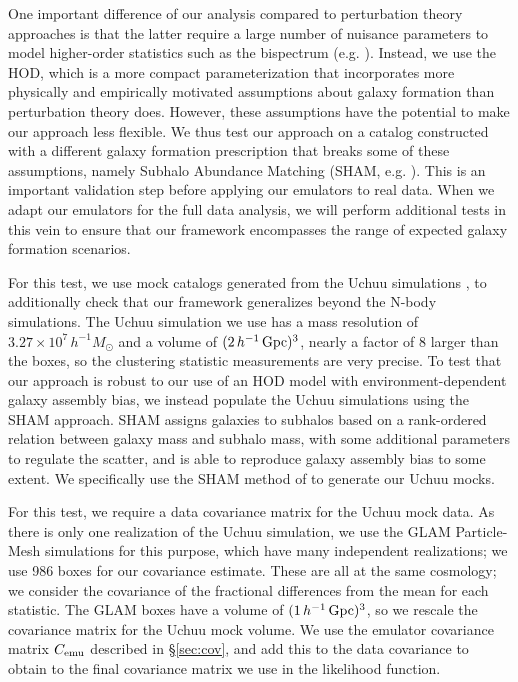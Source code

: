 One important difference of our analysis compared to perturbation theory approaches is that the latter require a large number of nuisance parameters to model higher-order statistics such as the bispectrum (e.g. \citealt{philcox_cosmology_2022}).
Instead, we use the HOD, which is a more compact parameterization that incorporates more physically and empirically motivated assumptions about galaxy formation than perturbation theory does.
However, these assumptions have the potential to make our approach less flexible.
We thus test our approach on a catalog constructed with a different galaxy formation prescription that breaks some of these assumptions, namely Subhalo Abundance Matching (SHAM, e.g. \citealt{vale_linking_2004, kravtsov_dark_2004, conroy_modeling_2006}).
This is an important validation step before applying our emulators to real data.
When we adapt our emulators for the full data analysis, we will perform additional tests in this vein to ensure that our framework encompasses the range of expected galaxy formation scenarios.

For this test, we use mock catalogs generated from the Uchuu simulations \citep{ishiyama_uchuu_2021}, to additionally check that our framework generalizes beyond the \aemulus N-body simulations.
The Uchuu simulation we use has a mass resolution of $3.27 \times 10^7 \, h^{-1} M_\odot$ and a volume of $(2 \, h^{-1}\,\mathrm{Gpc})^3$, nearly a factor of 8 larger than the \aemulus boxes, so the clustering statistic measurements are very precise.
To test that our approach is robust to our use of an HOD model with environment-dependent galaxy assembly bias, we instead populate the Uchuu simulations using the SHAM approach.
SHAM assigns galaxies to subhalos based on a rank-ordered relation between galaxy mass and subhalo mass, with some additional parameters to regulate the scatter, and is able to reproduce galaxy assembly bias to some extent.
We specifically use the SHAM method of \cite{lehmann_concentration_2016} to generate our Uchuu mocks.

For this test, we require a data covariance matrix for the Uchuu mock data.
As there is only one realization of the Uchuu simulation, we use the GLAM Particle-Mesh simulations \citep{KlypinPrada2018} for this purpose, which have many independent realizations; we use 986 boxes for our covariance estimate.
These are all at the same cosmology; we consider the covariance of the fractional differences from the mean for each statistic.
The GLAM boxes have a volume of $(1 \, h^{-1}\,\mathrm{Gpc})^3$, so we rescale the covariance matrix for the Uchuu mock volume.
We use the emulator covariance matrix $ C_\text{emu}$ described in \S\ref{sec:cov}, and add this to the data covariance to obtain to the final covariance matrix we use in the likelihood function.

